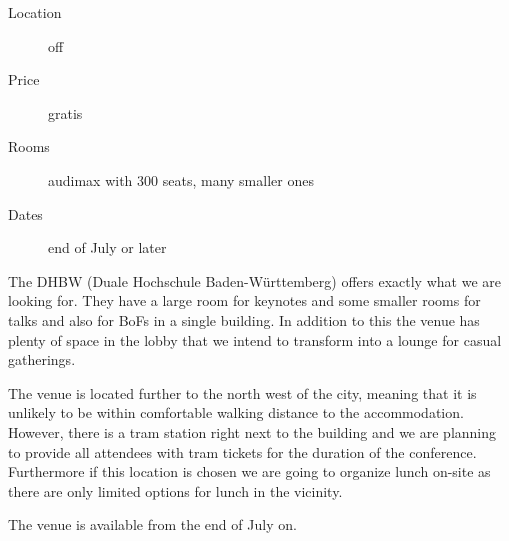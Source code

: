 

\begin{description}
\item[Location] off
\item[Price] gratis
\item[Rooms] audimax with 300 seats, many smaller ones
\item[Dates] end of July or later
\end{description}

The DHBW (Duale Hochschule Baden-Württemberg) offers exactly what we are looking for.
They have a large room for keynotes and some smaller rooms for talks and
also for BoFs in a single building. In addition to this the venue has
plenty of space in the lobby that we intend to transform into a lounge for
casual gatherings.

The venue is located further to the north west of the city, meaning that it is
unlikely to be within comfortable walking distance to the accommodation. However,
there is a tram station right next to the building and we are planning
to provide all attendees with tram tickets for the duration of the
conference. Furthermore if this location is chosen we are going to organize
lunch on-site as there are only limited options for lunch in the vicinity.

The venue is available from the end of July on.

\newpage

